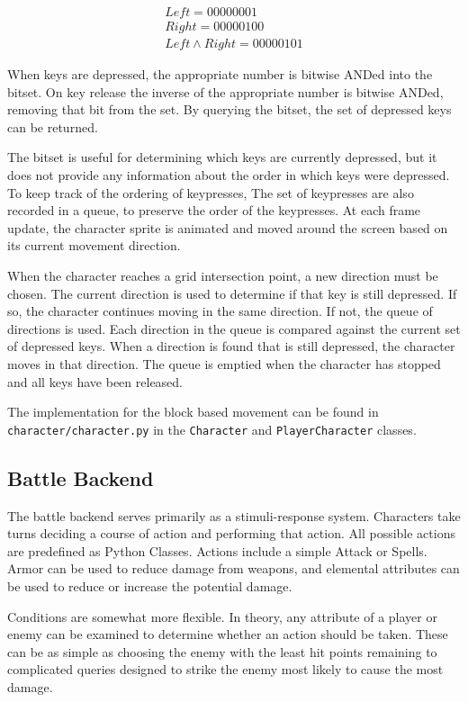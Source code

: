 \documentclass[11pt]{article}
\begin{document}
\begin{align*}
Left = 00000001 \\ 
Right = 00000100 \\
Left \land Right = 00000101
\end{align*}

When keys are depressed, the appropriate number is bitwise ANDed into the bitset.  On key release the inverse of the appropriate number is bitwise ANDed, removing that bit from the set.  By querying the bitset, the set of depressed keys can be returned.

The bitset is useful for determining which keys are currently depressed, but it does not provide any information about the order in which keys were depressed.  To keep track of the ordering of keypresses, The set of keypresses are also recorded in a queue, to preserve the order of the keypresses.  At each frame update, the character sprite is animated and moved around the screen based on its current movement direction.  

When the character reaches a grid intersection point, a new direction must be chosen.  The current direction is used to determine if that key is still depressed. If so, the character continues moving in the same direction.  If not, the queue of directions is used. Each direction in the queue is compared against the current set of depressed keys.  When a direction is found that is still depressed, the character moves in that direction.  The queue is emptied when the character has stopped and all keys have been released.

The implementation for the block based movement can be found in \texttt{character/character.py} in the \texttt{Character} and \texttt{PlayerCharacter} classes.

\subsection{Battle Backend}

The battle backend serves primarily as a stimuli-response system.  Characters take turns deciding a course of action and performing that action.  All possible actions are predefined as Python Classes.  Actions include a simple Attack or Spells.  Armor can be used to reduce damage from weapons, and elemental attributes can be used to reduce or increase the potential damage.  

Conditions are somewhat more flexible.  In theory, any attribute of a player or enemy can be examined to determine whether an action should be taken.  These can be as simple as choosing the enemy with the least hit points remaining to complicated queries designed to strike the enemy most likely to cause the most damage.
\end{document}
